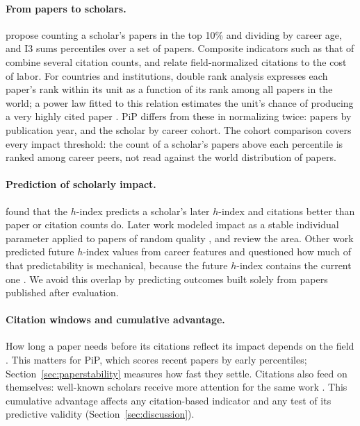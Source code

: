 \documentclass[11pt]{article}
\begin{document}
\paragraph{From papers to scholars.} \citet{bornmann2014individual} propose counting a scholar's papers in the top 10\%
and dividing by career age, and I3 \citep{leydesdorff2011integrated,rousseau2012basic} sums percentiles over a set of
papers. Composite indicators such as that of \citet{ioannidis2019standardized} combine several citation counts, and
\citet{abramo2014productivity} relate field-normalized citations to the cost of labor. For countries and institutions,
double rank analysis expresses each paper's rank within its unit as a function of its rank among all papers in the
world; a power law fitted to this relation estimates the unit's chance of producing a very highly cited paper
\citep{rodriguez2018double,brito2018percentile}. PiP differs from these in normalizing twice: papers by publication
year, and the scholar by career cohort. The cohort comparison covers every impact threshold: the count of a scholar's
papers above each percentile is ranked among career peers, not read against the world distribution of papers.

\paragraph{Prediction of scholarly impact.} \citet{hirsch2007does} found that the $h$-index predicts a scholar's
later $h$-index and citations better than paper or citation counts do. Later work modeled impact as a stable individual
parameter applied to papers of random quality \citep{sinatra2016quantifying}, and \citet{clauset2017datadriven} review
the area. Other work predicted future $h$-index values from career features \citep{acuna2012future} and questioned how
much of that predictability is mechanical, because the future $h$-index contains the current one
\citep{penner2013predictability}. We avoid this overlap by predicting outcomes built solely from papers published after
evaluation.

\paragraph{Citation windows and cumulative advantage.} How long a paper needs before its citations reflect its impact
depends on the field \citep{wang2013window,abramo2011window}. This matters for PiP, which scores recent papers by early
percentiles; Section~\ref{sec:paperstability} measures how fast they settle. Citations also feed on themselves:
well-known scholars receive more attention for the same work \citep{merton1968matthew,petersen2014reputation}. This
cumulative advantage affects any citation-based indicator and any test of its predictive validity
(Section~\ref{sec:discussion}).
\end{document}
